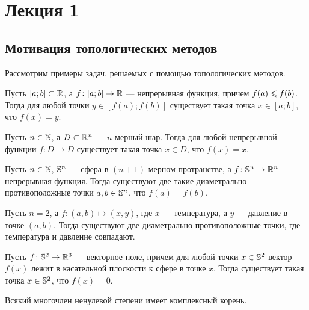 \documentclass[main]{subfiles}
\begin{document}
\section{Лекция 1}

\subsection{Мотивация топологических методов}

Рассмотрим примеры задач, решаемых с помощью топологических методов.

\begin{theorem*}
	Пусть $ [a; b] \subset \R $, а $ f \colon [a; b] \to \R $ --- непрерывная функция,
	причем $ f(a) \Le f(b) $. Тогда для любой точки $ y \in [f(a); f(b)] $ существует такая точка
	$ x \in [a; b] $, что $ f(x) = y $.
\end{theorem*}


\begin{theorem*}[Бр\'{а}уэра]
	Пусть $ n \in \N $, а $ D \subset \R^n $ --- $ n $-мерный шар. Тогда для любой
	непрерывной функции $ f \colon D \to D $ существует такая точка $ x \in D $, что $ f(x) = x $.
\end{theorem*}


\begin{theorem*}
	Пусть $ n \in \N $, $ \S^n $ --- сфера в $ (n + 1) $-мерном протранстве,
	а $ f \colon \S^n \to \R^n $ --- непрерывная функция. Тогда существуют две такие
	диаметрально противоположные точки $ a, b \in \S^n $, что $ f(a) = f(b) $.
\end{theorem*}

\begin{example}
	Пусть $ n = 2 $, а $ f \colon (a, b) \mapsto (x, y) $, где $ x $ --- температура,
	а $ y $ --- давление в точке $ (a, b) $. Тогда существуют две диаметрально противоположные точки,
	где температура и давление совпадают.
\end{example}

\begin{theorem*}
	Пусть $ f \colon \S^2 \to \R^3 $ --- векторное поле, причем для любой
	точки $ x \in \S^2 $ вектор $ f(x) $ лежит в касательной плоскости к сфере в точке $ x $.
	Тогда существует такая точка $ x \in \S^2 $, что $ f(x) = 0 $.
\end{theorem*}

\begin{theorem*}
	Всякий многочлен ненулевой степени имеет комплексный корень.
\end{theorem*}
\end{document}
